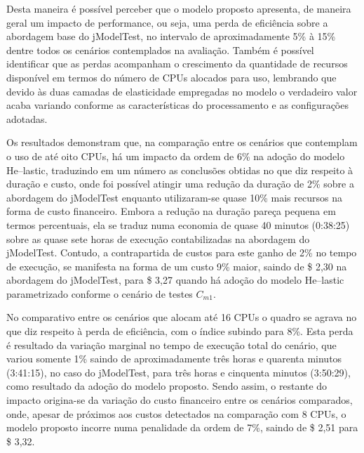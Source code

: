 \documentclass[english,brazilian]{UNISINOSmonografia} %
\begin{document}
Desta maneira é possível perceber que o modelo proposto apresenta, de maneira geral um impacto de performance, ou seja, uma perda de eficiência sobre a abordagem base do jModelTest, no intervalo de aproximadamente 5\% à 15\% dentre todos os cenários contemplados na avaliação.
%
Também é possível identificar que as perdas acompanham o crescimento da quantidade de recursos disponível em termos do número de CPUs alocados para uso, lembrando que devido às duas camadas de elasticidade empregadas no modelo o verdadeiro valor acaba variando conforme as características do processamento e as configurações adotadas.



Os resultados demonstram que, na comparação entre os cenários que contemplam o uso de até oito CPUs, há um impacto da ordem de 6\% na adoção do modelo \textsf{He}--lastic, traduzindo em um número as conclusões obtidas no que diz respeito à duração e custo, onde foi possível atingir uma redução da duração de 2\% sobre a abordagem do jModelTest enquanto utilizaram-se quase 10\% mais recursos na forma de custo financeiro.
%
Embora a redução na duração pareça pequena em termos percentuais, ela se traduz numa economia de quase 40 minutos (0:38:25) sobre as quase sete horas de execução contabilizadas na abordagem do jModelTest.
%
Contudo, a contrapartida de custos para este ganho de 2\% no tempo de execução, se manifesta na forma de um custo 9\% maior, saindo de \$ 2,30 na abordagem do jModelTest, para \$ 3,27 quando há adoção do modelo \textsf{He}--lastic parametrizado conforme o cenário de testes $C_{m1}$.




No comparativo entre os cenários que alocam até 16 CPUs o quadro se agrava no que diz respeito à perda de eficiência, com o índice subindo para 8\%.
%
Esta perda é resultado da variação marginal no tempo de execução total do cenário, que variou somente 1\% saindo de aproximadamente três horas e quarenta minutos (3:41:15), no caso do jModelTest, para três horas e cinquenta minutos (3:50:29), como resultado da adoção do modelo proposto.
%
Sendo assim, o restante do impacto origina-se da variação do custo financeiro entre os cenários comparados, onde, apesar de próximos aos custos detectados na comparação com 8 CPUs, o modelo proposto incorre numa penalidade da ordem de 7\%, saindo de \$ 2,51 para \$ 3,32.
%



\end{document}
